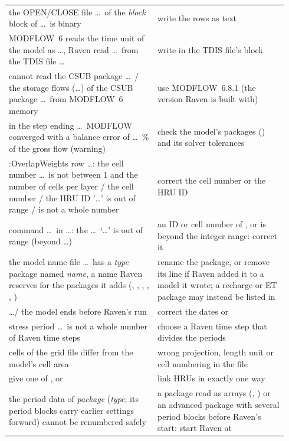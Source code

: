 \begin{longtable}{P{0.5\linewidth}P{0.44\linewidth}}
the OPEN/CLOSE file \dots\ of the \emph{block} block of \dots\ is binary & write the rows as text\\
MODFLOW~6 reads the time unit of the model as \dots, Raven read \dots\ from the TDIS file \dots & write  in the TDIS file's  block\\
cannot read the CSUB package \dots\ / the storage flows (\dots) of the CSUB package \dots\ from MODFLOW~6 memory & use MODFLOW~6.8.1 (the version Raven is built with)\\
in the step ending \dots\ MODFLOW converged with a balance error of \dots\ \% of the gross flow (warning) & check the model's packages () and its solver tolerances\\
:OverlapWeights row \dots: the cell number \dots\ is not between 1 and the number of cells per layer / the cell number / the HRU ID '\dots' is out of range / is not a whole number & correct the cell number or the HRU ID\\
command \dots\ in \dots: the \dots\ `\dots' is out of range (beyond \dots) & an ID or cell number of ,  or  is beyond the integer range: correct it\\
the model name file \dots\ has a \emph{type} package named \emph{name}, a name Raven reserves for the packages it adds (, , , , , ) & rename the package, or remove its line if Raven added it to a model it wrote; a recharge or ET package may instead be listed in \\
 \dots / the model ends before Raven's run & correct the dates or \\
stress period \dots\ is not a whole number of Raven time steps & choose a Raven time step that divides the periods\\
cells of the grid file differ from the model's cell area & wrong projection, length unit or cell numbering in the file\\
give one of ,  or  & link HRUs in exactly one way\\
the period data of \emph{package} (\emph{type}; its period blocks carry earlier settings forward) cannot be renumbered safely & a package read as arrays (, ) or an advanced package with several period blocks before Raven's start: start Raven at \\

\end{longtable}
